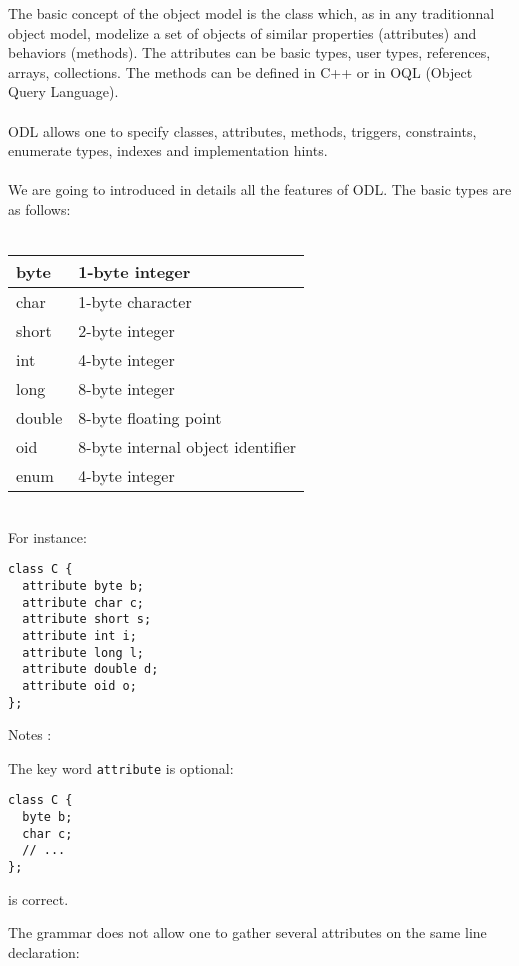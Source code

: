 
The basic concept of the \eyedb object model is the class which, as in any
traditionnal object model, modelize a set
of objects of similar properties (attributes) and behaviors (methods).
The attributes can be basic types, user types, references, arrays, collections.
The methods can be defined in C++ or in OQL (Object Query Language).
\\
\\
ODL allows one to specify classes, attributes, methods, triggers, constraints,
enumerate types, indexes and implementation hints.
\\
\\
We are going to introduced in details all the features of ODL.
The basic types are as follows:\\\\
\begin{tabular}{|p{2cm}|p{5cm}|}
\hline
byte & 1-byte integer \\
\hline
char & 1-byte character \\
\hline
short & 2-byte integer \\
\hline
int & 4-byte integer \\
\hline
long & 8-byte integer \\
\hline
double & 8-byte floating point \\
\hline
oid & 8-byte internal object identifier \\
\hline
enum & 4-byte integer \\
\hline
\end{tabular}
\\
For instance:
\vspace{-0.2cm}
\begin{verbatim}
class C {
  attribute byte b;
  attribute char c;
  attribute short s;
  attribute int i;
  attribute long l;
  attribute double d;
  attribute oid o;
};
\end{verbatim}
Notes :
\be
\vspace{-0.2cm}
\item The key word \texttt{attribute} is optional:
\vspace{-0.2cm}
\begin{verbatim}
class C {
  byte b;
  char c;
  // ...
};
\end{verbatim}
\vspace{-0.2cm}
is correct.
\item The grammar does not allow one to gather several attributes on
the same line declaration:
